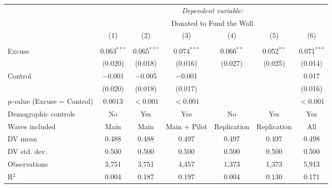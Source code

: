 
\begin{table}[!htbp] \centering 
  \label{t:2-main} 
\begin{threeparttable}
\begin{tabular}{@{\hspace{5pt}}l@{\hspace{5pt}}cccccc} 
\toprule 
 & \multicolumn{6}{c}{\textit{Dependent variable:}} \\ 
\cmidrule(rr){2-7} 
 & \multicolumn{6}{c}{Donated to Fund the Wall} \\ 
 \cmidrule(rr){2-7}
 & (1) & (2) & (3) & (4) & (5) & (6)\\ 
\midrule  
\\[-2.1ex] Excuse & 0.063$^{***}$ & 0.065$^{***}$ & 0.074$^{***}$ & 0.066$^{**}$ & 0.052$^{**}$ & 0.071$^{***}$ \\ 
  & (0.020) & (0.018) & (0.016) & (0.027) & (0.025) & (0.014) \\ 
 \addlinespace 
 Control & $-$0.001 & $-$0.005 & $-$0.001 &  &  & 0.017 \\ 
  & (0.020) & (0.018) & (0.017) &  &  & (0.016) \\ 
 \addlinespace 
p-value (Excuse = Control) & 0.0013 & $<0.001$ & $<0.001$ &  &  & $<0.001$ \\ 
\midrule  
Demographic controls & No & Yes & Yes & No & Yes & Yes \\ 
Waves included & Main & Main & Main + Pilot & Replication & Replication & All \\ 
\midrule
\addlinespace
DV mean & 0.488 & 0.488 & 0.497 & 0.497 & 0.497 & 0.498 \\
DV std. dev. & 0.500 & 0.500 & 0.500 & 0.500 & 0.500 & 0.500 \\
Observations & 3,751 & 3,751 & 4,457 & 1,373 & 1,373 & 5,913 \\ 
R$^{2}$ & 0.004 & 0.187 & 0.197 & 0.004 & 0.130 & 0.171 \\ 
\bottomrule 
\end{tabular} 
\end{threeparttable}
\end{table} 
